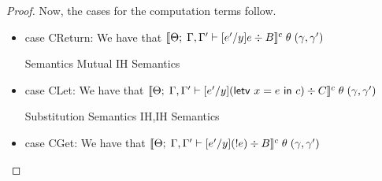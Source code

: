 \begin{proof}
Now, the cases for the computation terms follow.

\begin{itemize}
\item case CReturn: We have that $[\![{{\Theta};\;{\Gamma,\Gamma'} \vdash {[e'/y]e} \div {B}}]\!]^c\;\theta\;(\gamma,\gamma')$
  \begin{eqnproof}
          {Semantics}
          {Mutual IH}
          {Semantics}
  \end{eqnproof}

\item case CLet: We have that $[\![{{\Theta};\;{\Gamma,\Gamma'} \vdash {[e'/y](\mbox{\textsf{{letv }}}x = e\mbox{\textsf{{ in }}}c)} \div {C}}]\!]^c \;\theta\;(\gamma,\gamma')$

  \begin{eqnproof}
          {Substitution}
          {}
           {Semantics}
          {}
           {IH,IH}
          {Semantics}
  \end{eqnproof}

\item case CGet: We have that $[\![{{\Theta};\;{\Gamma,\Gamma'} \vdash {[e'/y](!e)} \div {B}}]\!]^c
                                       \;\theta\;(\gamma,\gamma')$


\end{itemize}
\end{proof}
